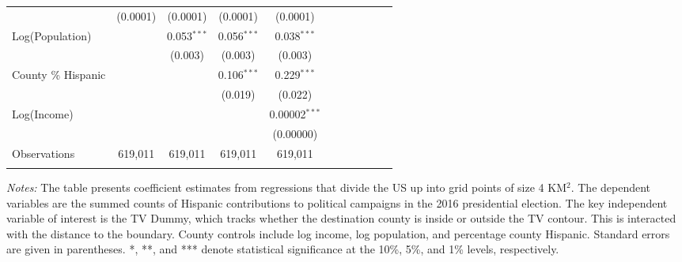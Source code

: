 \begin{table}[!h]
{\begin{threeparttable}
\begin{tabular}{lcccccccccc}
  & (0.0001) & (0.0001) & (0.0001) & (0.0001) \\ 
 Log(Population) &  & 0.053$^{***}$ & 0.056$^{***}$ & 0.038$^{***}$ \\ 
  &  & (0.003) & (0.003) & (0.003) \\ 
 County \% Hispanic &  &  & 0.106$^{***}$ & 0.229$^{***}$ \\ 
  &  &  & (0.019) & (0.022) \\ 
 Log(Income) &  &  &  & 0.00002$^{***}$ \\ 
  &  &  &  & (0.00000) \\ 
Observations & 619,011 & 619,011 & 619,011 & 619,011 \\ 
				\addlinespace\hline\hline
			\end{tabular}
			\begin{tablenotes}[flushleft]
				\item \textit{Notes:} The table presents coefficient estimates from regressions that divide the US up into grid points of size 4 KM$^2$. The dependent variables are the summed counts of Hispanic contributions to political campaigns in the 2016 presidential election. The key independent variable of interest is the TV Dummy, which tracks whether the destination county is inside or outside the TV contour. This is interacted with the distance to the boundary. County controls include log income, log population, and percentage county Hispanic. Standard errors are given in parentheses. *, **, and *** denote statistical significance at the 10\%, 5\%, and 1\% levels, respectively.
			\end{tablenotes}
		\end{threeparttable}
	}
\end{table}